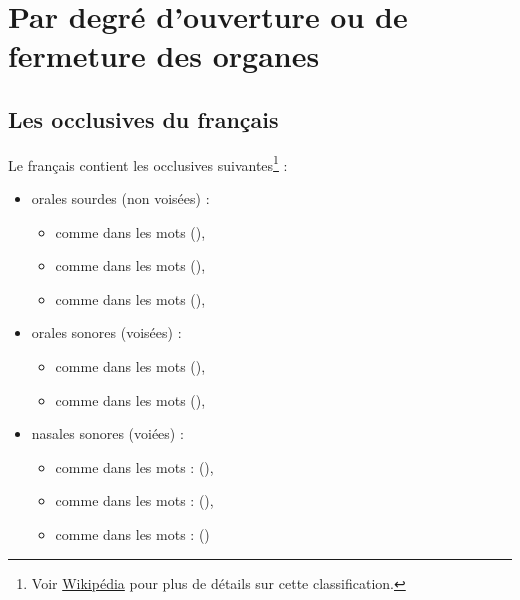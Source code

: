 \section{ Par degré d'ouverture ou de fermeture des
  organes}\label{sec:ouvr}
\subsection{Les occlusives du français}\label{subsec:occ}

Le français contient les occlusives suivantes\footnote{Voir
  \href{https://fr.wikipedia.org/wiki/Consonne_occlusive}{Wikipédia} pour plus de détails sur cette classification.} :
\begin{itemize}
\item orales sourdes (non voisées) :
  \begin{itemize}
  \item {} comme dans les mots
     (\href{http://www.wordreference.com/fren/papa}{}),
  \item {} comme dans les mots
    (\href{http://www.wordreference.com/fren/tonton}{}),
  \item {} comme dans les mots
     (\href{http://www.wordreference.com/fren/kermesse}{}), 
  \end{itemize}
\item orales sonores (voisées) :
  \begin{itemize}
  \item {} comme dans les mots
    (\href{http://www.wordreference.com/fren/ballon}{}),
  \item {} comme dans les mots 
     (\href{http://www.wordreference.com/fren/d\%C3\%A9crire}{}), 
  \end{itemize}
\item nasales sonores (voiées) :
  \begin{itemize}
  \item {} comme dans les mots :
    (\href{http://www.wordreference.com/fren/madame}{}),
  \item {} comme dans les mots : 
    (\href{http://www.wordreference.com/fren/nana}{}), 
  \item {} comme dans les mots :
    (\href{http://www.wordreference.com/fren/r\%C3\%A9gner}{})
  \end{itemize}
\end{itemize}

\newpage
\minitoc
